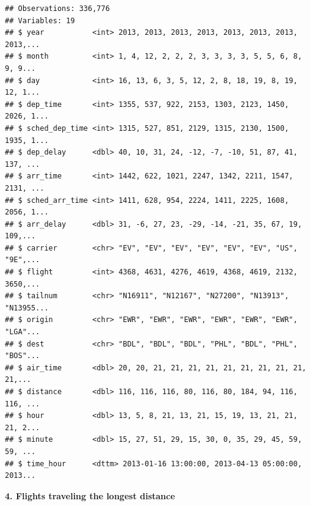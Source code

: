 \documentclass[]{book}
\newenvironment{Shaded}{\begin{snugshade}}{\end{snugshade}}
\newcommand{\KeywordTok}[1]{\textcolor[rgb]{0.13,0.29,0.53}{\textbf{#1}}}
\newcommand{\NormalTok}[1]{#1}
\newcommand{\OperatorTok}[1]{\textcolor[rgb]{0.81,0.36,0.00}{\textbf{#1}}}
\newcommand{\StringTok}[1]{\textcolor[rgb]{0.31,0.60,0.02}{#1}}
\theoremstyle{definition}
\theoremstyle{definition}
\theoremstyle{definition}
\theoremstyle{remark}
\begin{document}
\begin{verbatim}
## Observations: 336,776
## Variables: 19
## $ year           <int> 2013, 2013, 2013, 2013, 2013, 2013, 2013, 2013,...
## $ month          <int> 1, 4, 12, 2, 2, 2, 3, 3, 3, 3, 5, 5, 6, 8, 9, 9...
## $ day            <int> 16, 13, 6, 3, 5, 12, 2, 8, 18, 19, 8, 19, 12, 1...
## $ dep_time       <int> 1355, 537, 922, 2153, 1303, 2123, 1450, 2026, 1...
## $ sched_dep_time <int> 1315, 527, 851, 2129, 1315, 2130, 1500, 1935, 1...
## $ dep_delay      <dbl> 40, 10, 31, 24, -12, -7, -10, 51, 87, 41, 137, ...
## $ arr_time       <int> 1442, 622, 1021, 2247, 1342, 2211, 1547, 2131, ...
## $ sched_arr_time <int> 1411, 628, 954, 2224, 1411, 2225, 1608, 2056, 1...
## $ arr_delay      <dbl> 31, -6, 27, 23, -29, -14, -21, 35, 67, 19, 109,...
## $ carrier        <chr> "EV", "EV", "EV", "EV", "EV", "EV", "US", "9E",...
## $ flight         <int> 4368, 4631, 4276, 4619, 4368, 4619, 2132, 3650,...
## $ tailnum        <chr> "N16911", "N12167", "N27200", "N13913", "N13955...
## $ origin         <chr> "EWR", "EWR", "EWR", "EWR", "EWR", "EWR", "LGA"...
## $ dest           <chr> "BDL", "BDL", "BDL", "PHL", "BDL", "PHL", "BOS"...
## $ air_time       <dbl> 20, 20, 21, 21, 21, 21, 21, 21, 21, 21, 21, 21,...
## $ distance       <dbl> 116, 116, 116, 80, 116, 80, 184, 94, 116, 116, ...
## $ hour           <dbl> 13, 5, 8, 21, 13, 21, 15, 19, 13, 21, 21, 21, 2...
## $ minute         <dbl> 15, 27, 51, 29, 15, 30, 0, 35, 29, 45, 59, 59, ...
## $ time_hour      <dttm> 2013-01-16 13:00:00, 2013-04-13 05:00:00, 2013...
\end{verbatim}

\textbf{4. Flights traveling the longest distance}

\begin{Shaded}
\end{Shaded}
\end{document}
